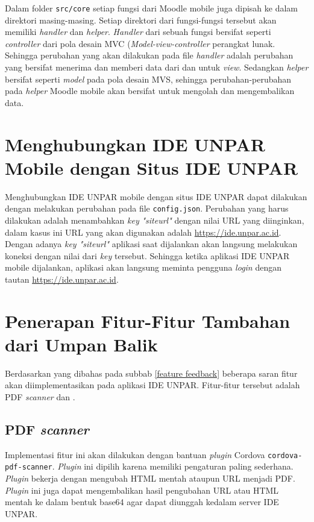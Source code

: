 Dalam folder \texttt{src/core} setiap fungsi dari Moodle mobile juga dipisah ke dalam direktori masing-masing. Setiap direktori dari fungsi-fungsi tersebut akan memiliki \textit{handler} dan \textit{helper}. \textit{Handler} dari sebuah fungsi bersifat seperti \textit{controller} dari pola desain MVC (\textit{Model-view-controller} perangkat lunak. Sehingga perubahan yang akan dilakukan pada file \textit{handler} adalah perubahan yang bersifat menerima dan memberi data dari dan untuk \textit{view}. Sedangkan \textit{helper} bersifat seperti \textit{model} pada pola desain MVS, sehingga perubahan-perubahan pada \textit{helper} Moodle mobile akan bersifat untuk mengolah dan mengembalikan data.

\section{Menghubungkan IDE UNPAR Mobile dengan Situs IDE UNPAR}
\label{mobile:connect}
Menghubungkan IDE UNPAR mobile dengan situs IDE UNPAR dapat dilakukan dengan melakukan perubahan pada file \texttt{config.json}.  Perubahan yang harus dilakukan adalah menambahkan \textit{key} \textit{"siteurl"} dengan nilai URL yang diinginkan, dalam kasus ini URL yang akan digunakan adalah \url{https://ide.unpar.ac.id}. Dengan adanya \textit{key "siteurl"} aplikasi saat dijalankan akan langsung melakukan koneksi dengan nilai dari \textit{key} tersebut. Sehingga ketika aplikasi IDE UNPAR mobile dijalankan, aplikasi akan langsung meminta pengguna \textit{login} dengan tautan \url{https://ide.unpar.ac.id}. 

\section{Penerapan Fitur-Fitur Tambahan dari Umpan Balik}
\label{feat:feedback}

Berdasarkan yang dibahas pada subbab \ref{feature feedback} beberapa saran fitur akan diimplementasikan pada aplikasi IDE UNPAR. Fitur-fitur tersebut adalah PDF \textit{scanner} dan .

\subsection{PDF \textit{scanner}}
\label{feat:pdfscan}
Implementasi fitur ini akan dilakukan dengan bantuan \textit{plugin} Cordova \texttt{cordova-pdf-scanner}. \textit{Plugin} ini dipilih karena memiliki pengaturan paling sederhana. \textit{Plugin} bekerja dengan mengubah HTML mentah ataupun URL menjadi PDF. \textit{Plugin} ini juga dapat mengembalikan hasil pengubahan URL atau HTML mentah ke dalam bentuk base64 agar dapat diunggah kedalam server IDE UNPAR. 

